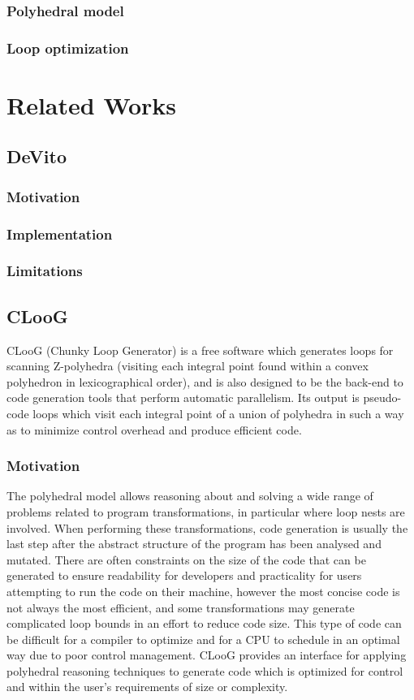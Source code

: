 \documentclass[a4paper,12pt,twoside]{report}
\begin{document}
\subsubsection{Polyhedral model}

\subsubsection{Loop optimization}

\section{Related Works}
\subsection{DeVito}
\subsubsection{Motivation}
\subsubsection{Implementation}
\subsubsection{Limitations}

\subsection{CLooG}
CLooG (Chunky Loop Generator) is a free software which generates loops for scanning Z-polyhedra (visiting each integral
point found within a convex polyhedron in lexicographical order), and is also designed to be
the back-end to code generation tools that perform automatic parallelism. Its output is pseudo-code loops which visit
each integral point of a union of polyhedra in such a way as to minimize control overhead and produce efficient code.
\subsubsection{Motivation}
The polyhedral model allows reasoning about and solving a wide range of problems related to program transformations,
in particular where loop nests are involved. When performing these transformations, code generation is usually the last
step after the abstract structure of the program has been analysed and mutated. There are often constraints on the size of the code
that can be generated to ensure readability for developers and practicality for users attempting to run the code on their machine,
however the most concise code is not always the most efficient, and some transformations may generate complicated loop bounds in an effort
to reduce code size. This type of code can be difficult for a compiler to optimize and for a CPU to schedule in an optimal way due to
poor control management. CLooG provides an interface for applying polyhedral reasoning techniques to generate code which is optimized for control
and within the user's requirements of size or complexity.
\end{document}
